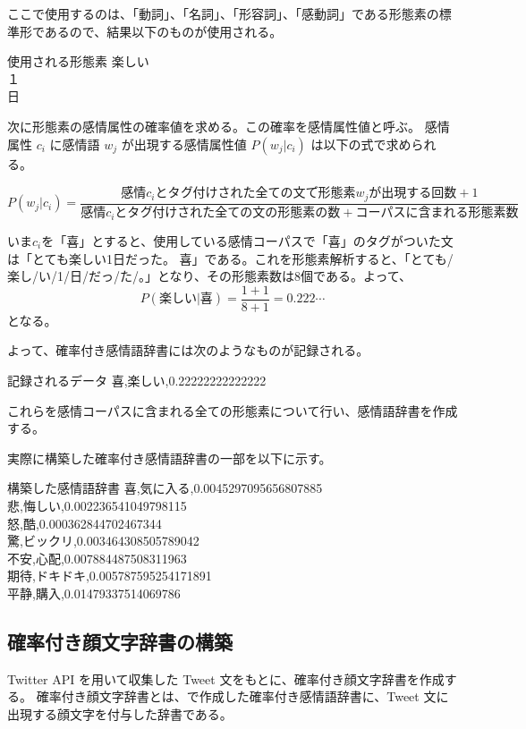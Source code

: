 \documentclass[11pt,a4j]{jsarticle}
\begin{document}
ここで使用するのは、「動詞」、「名詞」、「形容詞」、「感動詞」である形態素の標準形であるので、結果以下のものが使用される。

\begin{itembox}{使用される形態素}
   楽しい \\
   １\\
   日
 \end{itembox}
 
 次に形態素の感情属性の確率値を求める。この確率を感情属性値と呼ぶ。
 感情属性 $c_i$ に感情語 $w_j$ が出現する感情属性値 $P(w_j|c_i)$ は以下の式で求められる。

 \[
 P(w_j|c_i)=\frac{感情 c_i とタグ付けされた全ての文で形態素 w_j が出現する回数 +1}{感情 c_i とタグ付けされた全ての文の形態素の数 + コーパスに含まれる形態素数}
 \]

 いま$c_i$を「喜」とすると、使用している感情コーパスで「喜」のタグがついた文は「とても楽しい1日だった。 喜」である。これを形態素解析すると、「とても/楽し/い/1/日/だっ/た/。」となり、その形態素数は8個である。よって、
 \[
 P(楽しい|喜)=\frac{1 + 1}{8+1} = 0.222\cdots
 \]
 となる。

 よって、確率付き感情語辞書には次のようなものが記録される。
 \begin{itembox}{記録されるデータ}
   喜,楽しい,0.22222222222222 \\
 \end{itembox}

 これらを感情コーパスに含まれる全ての形態素について行い、感情語辞書を作成する。
 

実際に構築した確率付き感情語辞書の一部を以下に示す。

\begin{itembox}[h]{構築した感情語辞書}
   喜,気に入る,0.0045297095656807885\\
   悲,悔しい,0.002236541049798115\\
   怒,酷,0.000362844702467344\\
   驚,ビックリ,0.003464308505789042\\
   不安,心配,0.007884487508311963\\
   期待,ドキドキ,0.005787595254171891\\
   平静,購入,0.01479337514069786\\
\end{itembox}


  \subsection{確率付き顔文字辞書の構築}\label{sec:kaomojidic}
Twitter API を用いて収集した Tweet 文をもとに、確率付き顔文字辞書を作成する。
確率付き顔文字辞書とは、で作成した確率付き感情語辞書に、Tweet 文に出現する顔文字を付与した辞書である。
\end{document}

